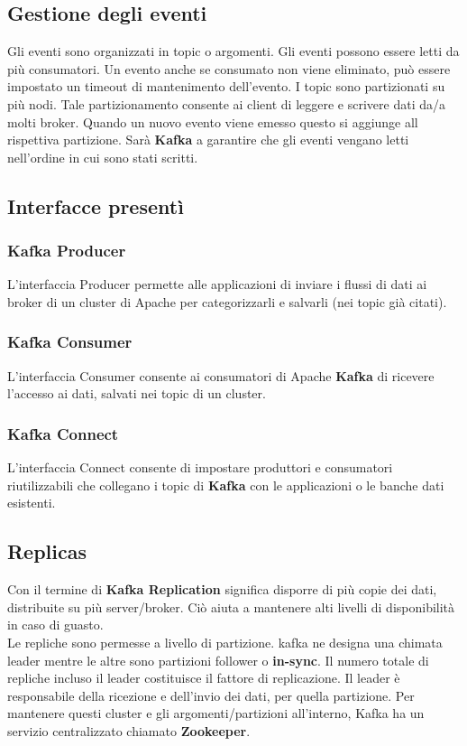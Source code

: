 \documentclass{article}
\begin{document}
\subsection{Gestione degli eventi}
Gli eventi sono organizzati in topic o argomenti. Gli eventi possono essere letti da più consumatori. 
Un evento anche se consumato non viene eliminato, può essere impostato un timeout di mantenimento dell'evento.
I topic sono partizionati su più nodi. Tale partizionamento consente ai client di leggere e scrivere dati da/a molti broker. Quando un nuovo evento viene emesso questo si aggiunge all rispettiva partizione. Sarà \textbf{\textbf{Kafka}} a garantire che gli eventi vengano letti nell'ordine in cui sono stati scritti.
\subsection{Interfacce presentì}
\subsubsection{\textbf{Kafka} Producer}
L’interfaccia Producer permette alle applicazioni di inviare i flussi di dati ai broker di un cluster di Apache per categorizzarli e salvarli (nei topic già citati).
\subsubsection{\textbf{Kafka} Consumer}
L’interfaccia Consumer consente ai consumatori di Apache \textbf{Kafka} di  ricevere l’accesso ai dati, salvati nei topic di un cluster.
 \subsubsection{\textbf{Kafka} Connect}
    L’interfaccia Connect  consente di impostare produttori e consumatori riutilizzabili che collegano i topic di \textbf{Kafka} con le applicazioni o le banche dati esistenti.
\subsection{Replicas}
Con il termine di \textbf{Kafka Replication} significa disporre di più copie dei dati, distribuite su più server/broker.
Ciò aiuta a mantenere alti livelli di disponibilità in caso di guasto. \\Le repliche sono permesse  a livello di partizione. kafka ne designa una chimata leader mentre le altre  sono partizioni follower o \textbf{in-sync}. Il numero totale di repliche incluso il leader costituisce il fattore di replicazione.
Il leader è responsabile della ricezione e dell'invio dei dati, per quella partizione.
Per mantenere questi cluster e gli argomenti/partizioni all'interno, Kafka ha un servizio centralizzato chiamato \textbf{Zookeeper}.
\end{document}
